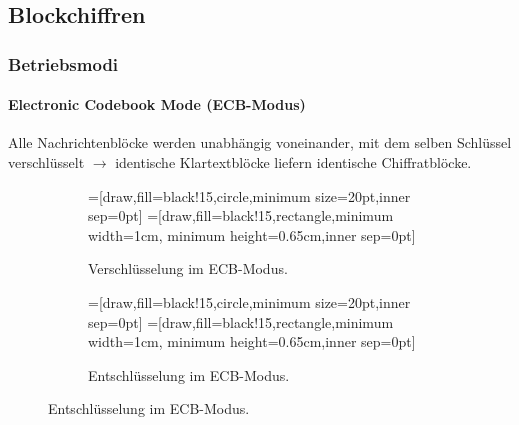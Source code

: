 \subsection{Blockchiffren}

\subsubsection{Betriebsmodi}

\paragraph{Electronic Codebook Mode (ECB-Modus)}
Alle Nachrichtenblöcke werden unabhängig voneinander, mit dem selben Schlüssel verschlüsselt \(\rightarrow\) identische Klartextblöcke liefern identische Chiffratblöcke.

\begin{figure}[h]
	\centering
	\begin{subfigure}[h]{.45\textwidth}
		\centering
		=[draw,fill=black!15,circle,minimum size=20pt,inner sep=0pt]
		=[draw,fill=black!15,rectangle,minimum width=1cm, minimum height=0.65cm,inner sep=0pt]
		\caption{Verschlüsselung im ECB-Modus.}
	\end{subfigure}
	\hfill
	\begin{subfigure}[h]{.45\textwidth}
		\centering
		=[draw,fill=black!15,circle,minimum size=20pt,inner sep=0pt]
		=[draw,fill=black!15,rectangle,minimum width=1cm, minimum height=0.65cm,inner sep=0pt]
		\caption{Entschlüsselung im ECB-Modus.}
	\end{subfigure}
\end{figure}
\FloatBarrier

